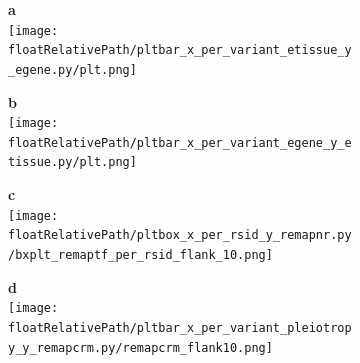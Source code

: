\begin{figure}[!ht]

    \centering

    \begin{subfigure}[]{.49\textwidth}
        \textbf{a}
        \\
        \texttt{[image: \\floatRelativePath/pltbar\_x\_per\_variant\_etissue\_y\_egene.py/plt.png]}
    \end{subfigure}
    \begin{subfigure}[]{.49\textwidth}
        \textbf{b}
        \\
        \texttt{[image: \\floatRelativePath/pltbar\_x\_per\_variant\_egene\_y\_etissue.py/plt.png]}
    \end{subfigure}

    \begin{subfigure}[]{.49\textwidth}
        \textbf{c}
        \\
        \texttt{[image: \\floatRelativePath/pltbox\_x\_per\_rsid\_y\_remapnr.py/bxplt\_remaptf\_per\_rsid\_flank\_10.png]}
    \end{subfigure}
    \begin{subfigure}[]{.49\textwidth}
        \textbf{d}
        \\
        \texttt{[image: \\floatRelativePath/pltbar\_x\_per\_variant\_pleiotropy\_y\_remapcrm.py/remapcrm\_flank10.png]}
    \end{subfigure}

    \caption{}

\end{figure}

%
%

